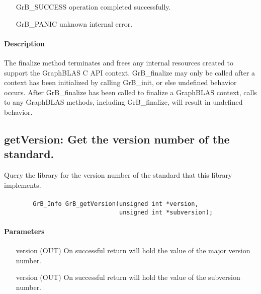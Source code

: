 \begin{itemize}[leftmargin=2.1in]
\item[{\sf GrB\_SUCCESS}]        operation completed successfully.
\item[{\sf GrB\_PANIC}]          unknown internal error.
\end{itemize}

\paragraph{Description}

The {\sf finalize} method terminates and frees any internal resources created to support the
GraphBLAS C API context.  {\sf GrB\_finalize} may only be called after
a context has been initialized by calling {\sf GrB\_init}, or else undefined
behavior occurs.  After {\sf GrB\_finalize}
has been called to finalize a GraphBLAS context, calls to any GraphBLAS methods,
including {\sf GrB\_finalize}, will result in undefined behavior.


\subsection{{\sf getVersion}: Get the version number of the standard.}

Query the library for the version number of the standard that this library
implements.

\paragraph{\syntax}

\begin{verbatim}
        GrB_Info GrB_getVersion(unsigned int *version,
                                unsigned int *subversion);
\end{verbatim}


\paragraph{Parameters}

\begin{itemize}[leftmargin=1.1in]
	\item[{\sf version}] ({\sf OUT})  On successful return will hold the value
    of the major version number.
	\item[{\sf version}] ({\sf OUT})  On successful return will hold the value
    of the subversion number.
\end{itemize}


